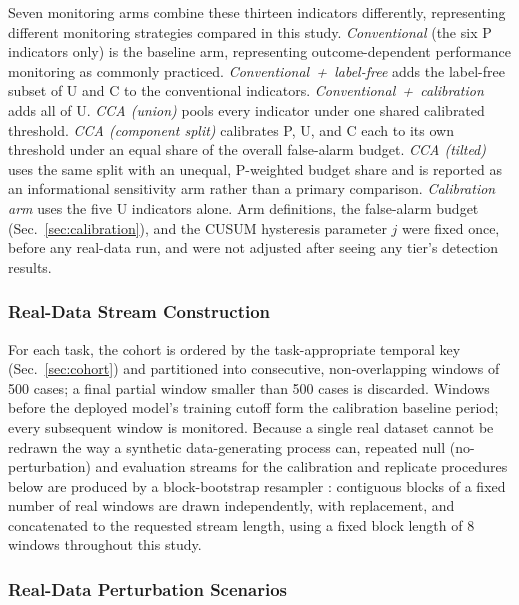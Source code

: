 \documentclass[preprintsapa,article,submit,oneauthor]{Definitions/mdpi}
\begin{document}
Seven monitoring arms combine these thirteen indicators differently, representing different monitoring strategies compared in this study. \emph{Conventional} (the six P indicators only) is the baseline arm, representing outcome-dependent performance monitoring as commonly practiced. \emph{Conventional~+~label-free} adds the label-free subset of U and C to the conventional indicators. \emph{Conventional~+~calibration} adds all of U. \emph{CCA (union)} pools every indicator under one shared calibrated threshold. \emph{CCA (component split)} calibrates P, U, and C each to its own threshold under an equal share of the overall false-alarm budget. \emph{CCA (tilted)} uses the same split with an unequal, P-weighted budget share and is reported as an informational sensitivity arm rather than a primary comparison. \emph{Calibration arm} uses the five U indicators alone. Arm definitions, the false-alarm budget (Sec.~\ref{sec:calibration}), and the CUSUM hysteresis parameter $j$ were fixed once, before any real-data run, and were not adjusted after seeing any tier's detection results.

\subsubsection{Real-Data Stream Construction}\label{sec:windowing}

For each task, the cohort is ordered by the task-appropriate temporal key (Sec.~\ref{sec:cohort}) and partitioned into consecutive, non-overlapping windows of 500 cases; a final partial window smaller than 500 cases is discarded. Windows before the deployed model's training cutoff form the calibration baseline period; every subsequent window is monitored. Because a single real dataset cannot be redrawn the way a synthetic data-generating process can, repeated null (no-perturbation) and evaluation streams for the calibration and replicate procedures below are produced by a block-bootstrap resampler \citep{kunsch1989}: contiguous blocks of a fixed number of real windows are drawn independently, with replacement, and concatenated to the requested stream length, using a fixed block length of 8 windows throughout this study.

\subsubsection{Real-Data Perturbation Scenarios}\label{sec:scenarios}
\end{document}
